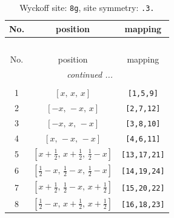 \documentclass[fleqn,8pt]{jsarticle}
\begin{document}
\renewcommand{\arraystretch}{1.2}
\begin{longtable}{ccc}
\caption{Wyckoff site: {\tt 8g}, site symmetry: {\tt .3.}}
 \\
 \hline \hline
No. & position & mapping \\ \hline \endfirsthead

\multicolumn{2}{l}{\tablename\ \thetable{}} \\
 \hline \hline
No. & position & mapping \\ \hline \endhead

 \hline \hline
\multicolumn{2}{r}{\footnotesize\it continued ...} \\ \endfoot

 \hline \hline
\multicolumn{2}{r}{} \\ \endlastfoot

1 & $\left[ x,\, x,\, x \right]$ & {\tt [1,5,9]} \\ \hline
2 & $\left[ - x,\, - x,\, x \right]$ & {\tt [2,7,12]} \\ \hline
3 & $\left[ - x,\, x,\, - x \right]$ & {\tt [3,8,10]} \\ \hline
4 & $\left[ x,\, - x,\, - x \right]$ & {\tt [4,6,11]} \\ \hline
5 & $\left[ x + \frac{1}{2},\, x + \frac{1}{2},\, \frac{1}{2} - x \right]$ & {\tt [13,17,21]} \\ \hline
6 & $\left[ \frac{1}{2} - x,\, \frac{1}{2} - x,\, \frac{1}{2} - x \right]$ & {\tt [14,19,24]} \\ \hline
7 & $\left[ x + \frac{1}{2},\, \frac{1}{2} - x,\, x + \frac{1}{2} \right]$ & {\tt [15,20,22]} \\ \hline
8 & $\left[ \frac{1}{2} - x,\, x + \frac{1}{2},\, x + \frac{1}{2} \right]$ & {\tt [16,18,23]} \\
\end{longtable}
\renewcommand{\arraystretch}{1.2}
\end{document}
